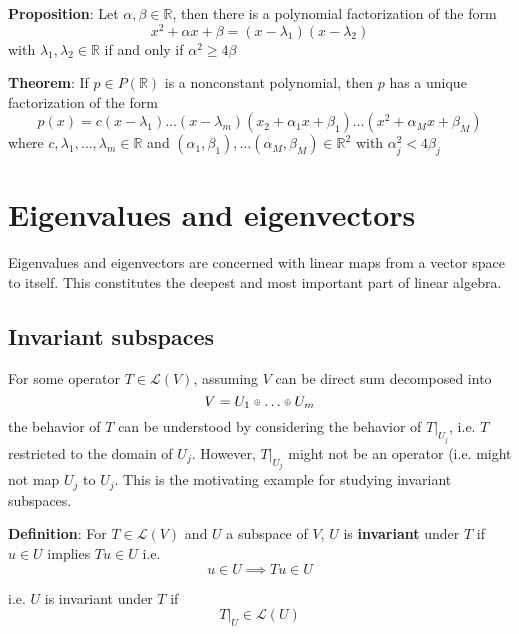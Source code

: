 \documentclass[a4paper, 10pt]{report}
\newcommand\smallmath[2]{#1{\raisebox{\dimexpr \fontdimen 22 \textfont 2
      - \fontdimen 22 \scriptscriptfont 2 \relax}{$\scriptscriptstyle #2$}}}
\newcommand\smalloplus{\smallmath\mathbin\oplus}
\begin{document}
\begin{framed}
   \textbf{Proposition}: Let $\alpha, \beta \in \mathbb{R}$, then there is a polynomial factorization of the form
   \[
     x^2 + \alpha x + \beta = (x - \lambda_1) (x - \lambda_2)
   \] 
   with $\lambda_1, \lambda_2 \in \mathbb{R}$ if and only if $\alpha^2 \geq 4 \beta$
\end{framed}

\begin{framed}
   \textbf{Theorem}: If $p \in P(\mathbb{R})$ is a nonconstant polynomial, then $p$ has a unique factorization of the form
   \[
     p(x) = c(x - \lambda_1) \hdots (x - \lambda_m) (x_2 + \alpha_1 x + \beta_1) \hdots (x^2 + \alpha_Mx + \beta_M)
   \] 
   where $c, \lambda_1, \hdots, \lambda_m \in \mathbb{R}$ and $(\alpha_1, \beta_1), \hdots (\alpha_M, \beta_M) \in \mathbb{R}^2$ with $\alpha_j^2 < 4\beta_j$
\end{framed}

\chapter{Eigenvalues and eigenvectors}

Eigenvalues and eigenvectors are concerned with linear maps from a vector space to itself. This constitutes the deepest and most important part of linear algebra. \\ 

\section{Invariant subspaces}


For some operator $T \in \mathcal{L}(V)$, assuming $V$ can be direct sum decomposed into
\[
  V = U_1 \smalloplus \hdots \smalloplus U_m
\]
the behavior of $T$ can be understood by considering the behavior of $\left. T \right|_{U_j}^{} $, i.e. $T$ restricted to the domain of $U_j$. However,  $\left. T \right|_{U_j}^{} $ might not be an operator (i.e. might not map $U_j$ to $U_j$. This is the motivating example for studying invariant subspaces. \\

\begin{framed}
   \textbf{Definition}: For $T \in \mathcal{L}(V)$ and $U$ a subspace of $V$, $U$ is \textbf{invariant} under $T$ if $u \in U $ implies  $Tu \in U$ i.e.
   \[
     u \in U \implies Tu \in U
   \] 

   i.e. $U$ is invariant under $T$ if
   \[
      \left. T \right|_{U}^{}  \in \mathcal{L}(U)
   \] 
\end{framed}
\end{document}
